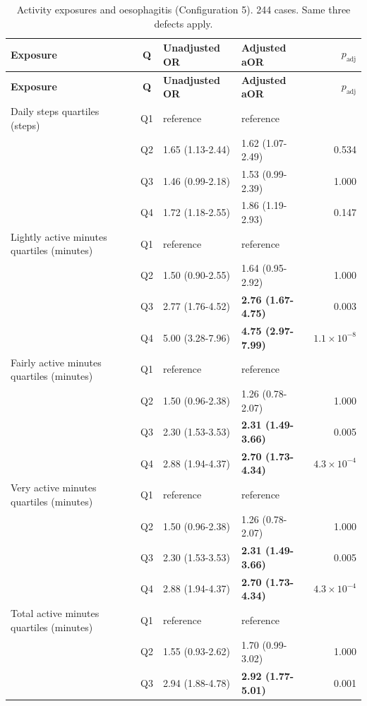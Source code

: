 \documentclass[11pt]{article}
\begin{document}
\begin{longtable}{@{}p{5.2cm}c p{3.0cm} p{3.0cm} r@{}}
\caption{Activity exposures and oesophagitis (Configuration 5). 244 cases. Same three defects apply.}\label{tab:res-act-eso}\\
\toprule \textbf{Exposure} & \textbf{Q} & \textbf{Unadjusted OR} & \textbf{Adjusted aOR} & \textbf{$p_{\text{adj}}$} \\ \midrule
\endfirsthead \toprule \textbf{Exposure} & \textbf{Q} & \textbf{Unadjusted OR} & \textbf{Adjusted aOR} & \textbf{$p_{\text{adj}}$} \\ \midrule \endhead
Daily steps quartiles (steps) & Q1 & reference & reference & \\
 & Q2 & 1.65 (1.13-2.44) & 1.62 (1.07-2.49) & 0.534 \\
 & Q3 & 1.46 (0.99-2.18) & 1.53 (0.99-2.39) & 1.000 \\
 & Q4 & 1.72 (1.18-2.55) & 1.86 (1.19-2.93) & 0.147 \\
\addlinespace
Lightly active minutes quartiles (minutes) & Q1 & reference & reference & \\
 & Q2 & 1.50 (0.90-2.55) & 1.64 (0.95-2.92) & 1.000 \\
 & Q3 & 2.77 (1.76-4.52) & \textbf{2.76 (1.67-4.75)} & 0.003 \\
 & Q4 & 5.00 (3.28-7.96) & \textbf{4.75 (2.97-7.99)} & $1.1\times10^{-8}$ \\
\addlinespace
Fairly active minutes quartiles (minutes) & Q1 & reference & reference & \\
 & Q2 & 1.50 (0.96-2.38) & 1.26 (0.78-2.07) & 1.000 \\
 & Q3 & 2.30 (1.53-3.53) & \textbf{2.31 (1.49-3.66)} & 0.005 \\
 & Q4 & 2.88 (1.94-4.37) & \textbf{2.70 (1.73-4.34)} & $4.3\times10^{-4}$ \\
\addlinespace
Very active minutes quartiles (minutes) & Q1 & reference & reference & \\
 & Q2 & 1.50 (0.96-2.38) & 1.26 (0.78-2.07) & 1.000 \\
 & Q3 & 2.30 (1.53-3.53) & \textbf{2.31 (1.49-3.66)} & 0.005 \\
 & Q4 & 2.88 (1.94-4.37) & \textbf{2.70 (1.73-4.34)} & $4.3\times10^{-4}$ \\
\addlinespace
Total active minutes quartiles (minutes) & Q1 & reference & reference & \\
 & Q2 & 1.55 (0.93-2.62) & 1.70 (0.99-3.02) & 1.000 \\
 & Q3 & 2.94 (1.88-4.78) & \textbf{2.92 (1.77-5.01)} & 0.001 \\

\end{longtable}
\end{document}
